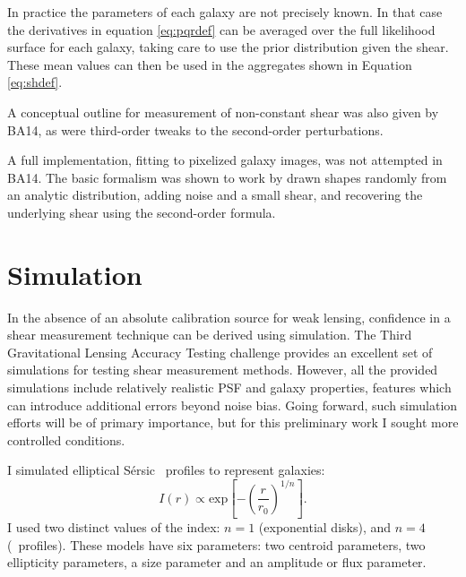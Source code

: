 \documentclass[usegraphicx,usenatbib]{mn2e}
\newcommand{\vecg}{\mbox{\boldmath $g$}}
\newcommand{\vecD}{\mbox{\boldmath $D$}}
\newcommand{\vecQ}{\mbox{\boldmath $Q$}}
\newcommand{\matR}{\mbox{$\bf R$}}
\newcommand{\bnabg}{ \boldsymbol{\nabla_g}}
\newcommand{\sersic}{S\'{e}rsic}
\begin{document}
In practice the parameters of each galaxy are not precisely known. In that case
the derivatives in equation \ref{eq:pqrdef} can be averaged over the full
likelihood surface for each galaxy, taking care to use the prior
distribution given the shear.  These mean values can then be used in the
aggregates shown in Equation \ref{eq:shdef}.

A conceptual outline for measurement of non-constant shear was also given by
BA14, as were third-order tweaks to the second-order perturbations.

A full implementation, fitting to pixelized galaxy images, was not attempted in
BA14.  The basic formalism was shown to work by drawn shapes randomly from an
analytic distribution, adding noise and a small shear, and recovering the
underlying shear using the second-order formula.

\section{Simulation} \label{sec:sim}

In the absence of an absolute calibration source for weak lensing, confidence
in a shear measurement technique can be derived using simulation.  The Third
Gravitational Lensing Accuracy Testing challenge \citep[GREAT3,][]{great3}
provides an excellent set of simulations for testing shear measurement methods.
However, all the provided simulations include relatively realistic PSF and
galaxy properties, features which can introduce additional errors beyond noise
bias.  Going forward, such simulation efforts will be of primary importance,
but for this preliminary work I sought more controlled conditions.

I simulated elliptical \sersic\ \citep{Sersic63} profiles to represent galaxies:
\begin{equation}
I(r) \propto \mathrm{exp} \left[ -\left( \frac{r}{r_0} \right)^{1/n} \right].
\end{equation}
I used two distinct values of the index: $n=1$ (exponential
disks), and $n=4$ (\devauc\ profiles).  These models have six parameters:
two centroid parameters, two ellipticity parameters, a size parameter
and an amplitude or flux parameter.
\end{document}
